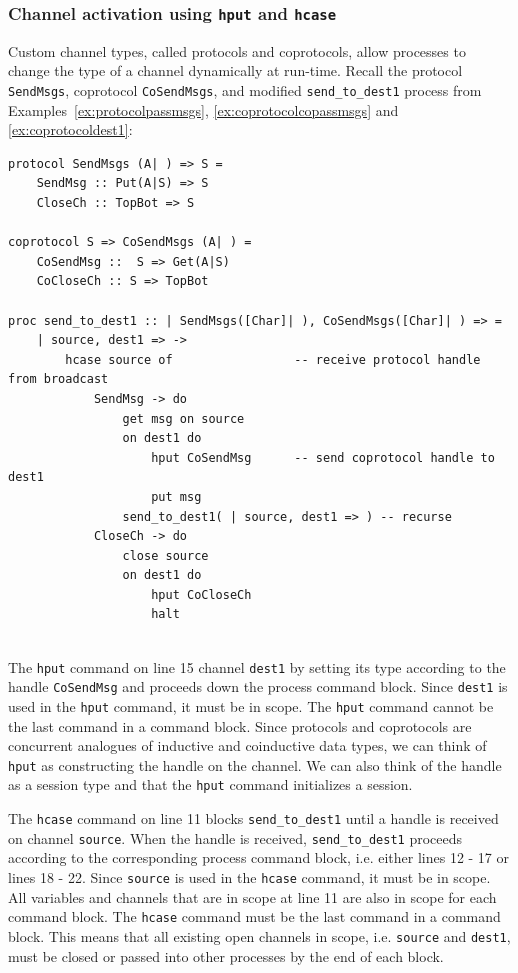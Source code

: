 \documentclass[11pt]{article}
\begin{document}
\subsubsection{Channel activation using {\tt hput} and {\tt hcase}}
\label{subsec:hput-hcase}

Custom channel types, called protocols and coprotocols, allow processes to change the type of a channel dynamically at run-time.
Recall the protocol \lstinline$SendMsgs$, coprotocol \lstinline$CoSendMsgs$, and modified \lstinline$send_to_dest1$ process from Examples~\ref{ex:protocolpassmsgs}, \ref{ex:coprotocolcopassmsgs} and \ref{ex:coprotocoldest1}:
\begin{lstlisting}
protocol SendMsgs (A| ) => S =		
    SendMsg :: Put(A|S) => S 				
    CloseCh :: TopBot => S 				

coprotocol S => CoSendMsgs (A| ) =
    CoSendMsg ::  S => Get(A|S)
    CoCloseCh :: S => TopBot

proc send_to_dest1 :: | SendMsgs([Char]| ), CoSendMsgs([Char]| ) => =
	| source, dest1 => -> 
		hcase source of					-- receive protocol handle from broadcast
			SendMsg -> do
				get msg on source 		
				on dest1 do
					hput CoSendMsg		-- send coprotocol handle to dest1
					put msg
				send_to_dest1( | source, dest1 => ) -- recurse
			CloseCh -> do
				close source
				on dest1 do
					hput CoCloseCh
					halt
				
 \end{lstlisting}
The \lstinline$hput$ command on line 15  channel \lstinline$dest1$ by setting its type according to the handle \lstinline$CoSendMsg$ and proceeds down the process command block.
Since \lstinline$dest1$ is used in the \lstinline$hput$ command, it must be in scope. 
The \lstinline$hput$ command cannot be the last command in a command block. 
Since protocols and coprotocols are concurrent analogues of inductive and coinductive data types, we can think of \lstinline$hput$ as constructing the handle on the channel.
We can also think of the handle as a session type and that the \lstinline$hput$ command initializes a session.

The \lstinline$hcase$ command on line 11 blocks \lstinline$send_to_dest1$ until a handle is received on channel \lstinline$source$.
When the handle is received, \lstinline$send_to_dest1$ proceeds according to the corresponding process command block, i.e. either lines 12 - 17 or lines 18 - 22.
Since \lstinline$source$ is used in the \lstinline$hcase$ command, it must be in scope. 
All variables and channels that are in scope at line 11 are also in scope for each command block.
The \lstinline$hcase$ command must be the last command in a command block. 
This means that all existing open channels in scope, i.e. \lstinline$source$ and \lstinline$dest1$, must be closed or passed into other processes by the end of each block.
\end{document}
